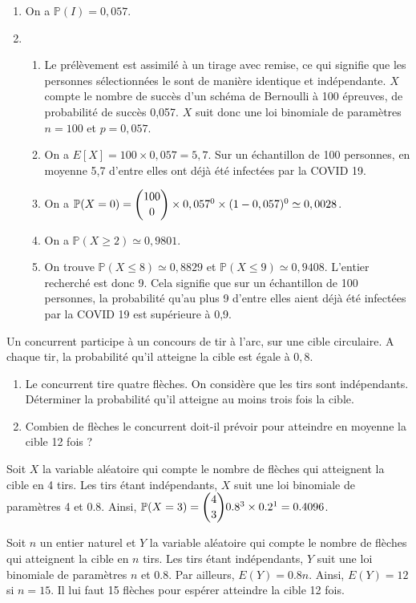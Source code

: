 \documentclass[11pt,fleqn, openany]{book} %
\begin{document}
\begin{solution}\hspace{0pt}
\begin{enumerate}
\item On a $\mathbb{P}(I)=0,057$.
\item \begin{enumerate}
\item Le prélèvement est assimilé à un tirage avec remise, ce qui signifie que les personnes sélectionnées le sont de manière identique et indépendante. $X$ compte le nombre de succès d'un schéma de Bernoulli à 100 épreuves, de probabilité de succès 0,057. $X$ suit donc une loi binomiale de paramètres $n=100$ et $p=0,057$.
\item On a $E[X]=100 \times 0,057=5,7$. Sur un échantillon de 100 personnes, en moyenne 5,7 d'entre elles ont déjà été infectées par la COVID 19.
\item On a $\mathbb{P}(X=0)=\dbinom{100}{0} \times 0,057^0 \times (1-0,057)^0 \simeq 0,0028$.
\item On a $\mathbb{P}(X \geqslant 2) \simeq 0,9801$.
\item On trouve $\mathbb{P}(X \leqslant 8) \simeq 0,8829$ et $\mathbb{P}(X \leqslant 9) \simeq 0,9408$. L'entier recherché est donc 9. Cela signifie que sur un échantillon de 100 personnes, la probabilité qu'au plus 9 d'entre elles aient déjà été infectées par la COVID 19 est supérieure à 0,9.
\end{enumerate}
\end{enumerate}

\end{solution}


\begin{exercise}[topic=prob12, subtitle={(Asie 2015)}]
Un concurrent participe à un concours de tir à l'arc, sur une cible circulaire. A chaque tir, la probabilité qu'il atteigne la cible est égale à $0,8$.
\begin{enumerate}
\item Le concurrent tire quatre flèches. On considère que les tirs sont indépendants. Déterminer la probabilité qu'il atteigne au moins trois fois la cible.
\item Combien de flèches le concurrent doit-il prévoir pour atteindre en moyenne la cible 12 fois ?
\end{enumerate} 
 \end{exercise}
 
 \begin{solution}
Soit $X$ la variable aléatoire qui compte le nombre de flèches qui atteignent la cible en 4 tirs. Les tirs étant indépendants, $X$ suit une loi binomiale de paramètres 4 et 0.8. Ainsi, $\mathbb{P}(X=3)=\dbinom{4}{3}0.8^3 \times 0.2^1 = 0.4096$.

Soit $n$ un entier naturel et $Y$ la variable aléatoire qui compte le nombre de flèches qui atteignent la cible en $n$ tirs. Les tirs étant indépendants, $Y$ suit une loi binomiale de paramètres $n$ et 0.8. Par ailleurs, $E(Y)=0.8n$. Ainsi, $E(Y)=12$ si $n=15$. Il lui faut 15 flèches pour espérer atteindre la cible 12 fois.
\end{solution}
\end{document}
